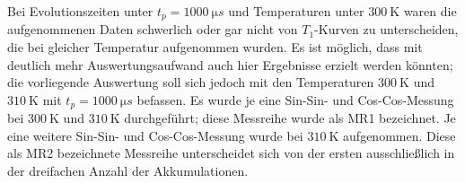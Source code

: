 Bei Evolutionszeiten unter $t_p = \SI{1000}{\micro s}$ und Temperaturen unter $\SI{300}{\kelvin}$ waren die aufgenommenen Daten schwerlich oder gar nicht von $T_1$-Kurven zu unterscheiden, die bei gleicher Temperatur aufgenommen wurden. Es ist möglich, dass mit deutlich mehr Auswertungsaufwand auch hier Ergebnisse erzielt werden könnten; die vorliegende Auswertung soll sich jedoch mit den Temperaturen $\SI{300}{\kelvin}$ und $\SI{310}{\kelvin}$ mit $t_p = \SI{1000}{\micro s}$ befassen. Es wurde je eine Sin-Sin- und Cos-Cos-Messung bei $\SI{300}{\kelvin}$ und $\SI{310}{\kelvin}$ durchgeführt; diese Messreihe wurde als MR1 bezeichnet. Je eine weitere Sin-Sin- und Cos-Cos-Messung wurde bei $\SI{310}{\kelvin}$ aufgenommen. Diese als MR2 bezeichnete Messreihe unterscheidet sich von der ersten ausschließlich in der dreifachen Anzahl der Akkumulationen.

